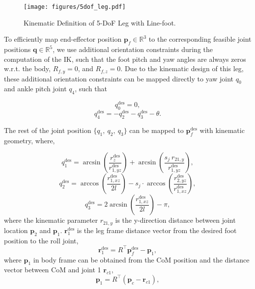 \begin{figure}[h!]
    \texttt{[image: figures/5dof\_leg.pdf]}
    \caption{Kinematic Definition of 5-DoF Leg with Line-foot.}
    \label{fig:leg}
\end{figure}

To efficiently map end-effector position $\bm p_f \in \mathbb R^3$ to the corresponding feasible joint positions $\bm q \in \mathbb R^5$, we use additional orientation constraints during the computation of the IK, such that the foot pitch and yaw angles are always zeros w.r.t. the body, $R_{f,y} = 0$, and $R_{f,z} = 0$. Due to the kinematic design of this leg, these additional orientation constraints can be mapped directly to yaw joint $q_0$ and ankle pitch joint $q_4$, such that

\begin{equation}
    q_0^\text{des} = 0,
\end{equation}
\begin{equation}
    q_4^\text{des} = - q_2^\text{des}- q_3^\text{des}-\theta.
\end{equation}

The rest of the joint position $\{q_1,\:q_2,\:q_3\}$ can be mapped to $\bm p_f^\text{des}$ with kinematic geometry, where,

\begin{equation}
    q_1^\text{des} = \arcsin({\frac{r^\text{des}_z}{r^\text{des}_{1,yz}}}) + \arcsin({\frac{s_j\:r_{21,y}}{r^\text{des}_{1,yz}}}),
\end{equation}
\begin{equation}
    q_2^\text{des} = \arccos({\frac{r^\text{des}_{1,xz}}{2l}})- s_j \cdot \arccos({\frac{r^\text{des}_{2,yz}}{r^\text{des}_{1,xz}}}),
\end{equation}
\begin{equation}
    q_3^\text{des} = 2\arcsin({\frac{r^\text{des}_{1,xz}}{2l}})- \pi,
\end{equation}
where the kinematic parameter $r_{21,y}$ is the y-direction distance between joint location $\bm p_2$ and $\bm p_1$. 
$\bm r^\text{des}_{1}$ is the leg frame distance vector from the desired foot position to the roll joint,
\begin{equation}
    \bm r^\text{des}_{1} = R^\intercal\bm p_f^\text{des}-\bm p_1,
\end{equation}
where $\bm p_1$ in body frame can be obtained from the CoM position and the distance vector between CoM and joint 1 $\bm r_{c1}$,
\begin{equation}
    \bm p_1 = R^\intercal(\bm p_c - \bm r_{c1}),
\end{equation}

